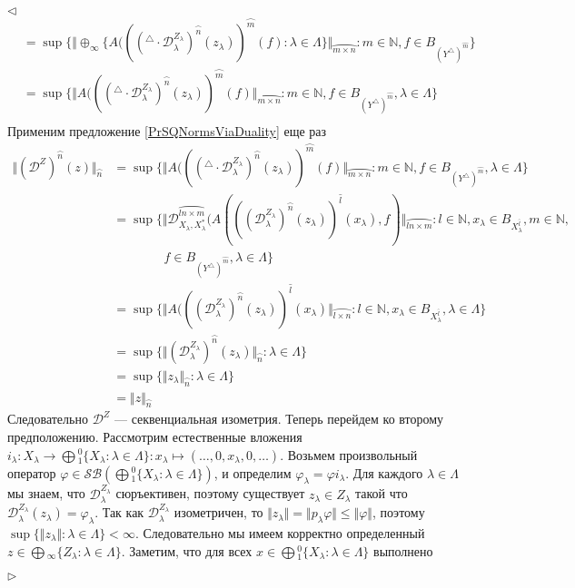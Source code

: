 \documentclass[12pt]{article}
\newenvironment{proof}{\par $\triangleleft$}{$\triangleright$}
\begin{document}
\begin{proof}
$$\begin{aligned}
&=\sup\{\Vert \oplus_\infty\{A((({}^\triangle\cdot\mathcal{D}_\lambda^{Z_\lambda})^{\wideparen{n}}(z_\lambda))^{\wideparen{m}}(f):\lambda\in\Lambda\}\Vert_{\wideparen{m\times n}}: m\in\mathbb{N},f\in B_{(Y^\triangle)^{\wideparen{m}}}\}\\
&=\sup\{\Vert A((({}^\triangle\cdot\mathcal{D}_\lambda^{Z_\lambda})^{\wideparen{n}}(z_\lambda))^{\wideparen{m}}(f)\Vert_{\wideparen{m\times n}}: m\in\mathbb{N},f\in B_{(Y^\triangle)^{\wideparen{m}}},\lambda\in\Lambda\}\\
\end{aligned}
$$
Применим предложение \ref{PrSQNormsViaDuality} еще раз
$$
\begin{aligned}
\Vert(\mathcal{D}^Z)^{\wideparen{n}}(z)\Vert_{\wideparen{n}}
&=\sup\{\Vert A((({}^\triangle\cdot\mathcal{D}_\lambda^{Z_\lambda})^{\wideparen{n}}(z_\lambda))^{\wideparen{m}}(f)\Vert_{\wideparen{m\times n}}: m\in\mathbb{N},f\in B_{(Y^\triangle)^{\wideparen{m}}},\lambda\in\Lambda\}\\
&=\sup\{\Vert\mathcal{D}_{X_\lambda,X_\lambda^*}^{\wideparen{ln\times m}}(A(((\mathcal{D}_\lambda^{Z_\lambda})^{\wideparen{n}}(z_\lambda))^{\wideparen{l}}(x_\lambda),f)\Vert_{\wideparen{ln\times m}}: l\in\mathbb{N},x_\lambda\in B_{X_\lambda^{\wideparen{l}}},m\in\mathbb{N},\\
&\qquad\qquad f\in B_{(Y^\triangle)^{\wideparen{m}}},\lambda\in\Lambda\}\\
&=\sup\{\Vert A(((\mathcal{D}_\lambda^{Z_\lambda})^{\wideparen{n}}(z_\lambda))^{\wideparen{l}}(x_\lambda)\Vert_{\wideparen{l\times n}}: l\in\mathbb{N},x_\lambda\in B_{X_\lambda^{\wideparen{l}}},\lambda\in\Lambda\}\\
&=\sup\{\Vert (\mathcal{D}_\lambda^{Z_\lambda})^{\wideparen{n}}(z_\lambda)\Vert_{\wideparen{n}}: \lambda\in\Lambda\}\\
&=\sup\{\Vert z_\lambda \Vert_{\wideparen{n}}: \lambda\in\Lambda\}\\
&=\Vert z \Vert_{\wideparen{n}}
\end{aligned}
$$
Следовательно $\mathcal{D}^Z$ --- секвенциальная изометрия. Теперь перейдем ко второму предположению. Рассмотрим естественные вложения $i_\lambda:X_\lambda\to\bigoplus{}_1^0\{X_\lambda:\lambda\in\Lambda\}:x_\lambda\mapsto (\ldots,0,x_\lambda,0,\ldots)$. Возьмем произвольный оператор $\varphi\in\mathcal{SB}(\bigoplus{}_1^0\{X_\lambda:\lambda\in\Lambda\})$, и определим $\varphi_\lambda=\varphi i_\lambda$. Для каждого $\lambda\in\Lambda$ мы знаем, что  $\mathcal{D}_\lambda^{Z_\lambda}$ сюръективен, поэтому существует $z_\lambda\in Z_\lambda$ такой что $\mathcal{D}_\lambda^{Z_\lambda}(z_\lambda)=\varphi_\lambda$. Так как $\mathcal{D}_\lambda^{Z_\lambda}$ изометричен, то $\Vert z_\lambda\Vert=\Vert p_\lambda\varphi\Vert\leq\Vert \varphi\Vert$, поэтому $\sup\{\Vert z_\lambda\Vert:\lambda\in\Lambda\}<\infty$. Следовательно мы имеем корректно определенный $z\in\bigoplus{}_\infty\{Z_\lambda:\lambda\in\Lambda\}$. Заметим, что для всех $x\in \bigoplus{}_1^0\{X_\lambda:\lambda\in\Lambda\}$ выполнено

\end{proof}
\end{document}

